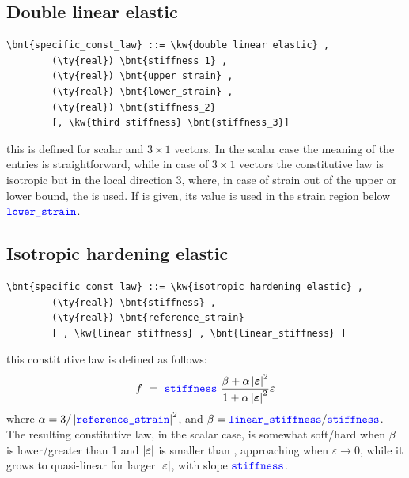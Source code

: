 \subsection{Double linear elastic}
\begin{Verbatim}[commandchars=\\\{\}]
    \bnt{specific_const_law} ::= \kw{double linear elastic} ,
        (\ty{real}) \bnt{stiffness_1} ,
        (\ty{real}) \bnt{upper_strain} ,
        (\ty{real}) \bnt{lower_strain} ,
        (\ty{real}) \bnt{stiffness_2}
        [, \kw{third stiffness} \bnt{stiffness_3}]
\end{Verbatim}
this is defined for scalar and $3 \times 1$ vectors. In the scalar case the
meaning of the entries is straightforward,
while in case of $3 \times 1$ vectors the constitutive law is isotropic
but in the local direction 3, where, in case of strain
out of the upper or lower bound, the  is used.
If  is given, its value is used in the strain region 
below $\textcolor{blue}{\texttt{lower\_strain}}$.
\subsection{Isotropic hardening elastic}
\begin{Verbatim}[commandchars=\\\{\}]
    \bnt{specific_const_law} ::= \kw{isotropic hardening elastic} ,
        (\ty{real}) \bnt{stiffness} ,
        (\ty{real}) \bnt{reference_strain}
        [ , \kw{linear stiffness} , \bnt{linear_stiffness} ]
\end{Verbatim}
this constitutive law is defined as follows:
\begin{displaymath}
    f \ = \ \textcolor{blue}{\texttt{stiffness}} \ \frac{
        \beta + \alpha\left| \boldsymbol{\varepsilon} \right|^2
    }{
        1 + \alpha\left| \boldsymbol{\varepsilon} \right|^2
    }\varepsilon
\end{displaymath}
where $\alpha=3/\left| \textcolor{blue}{\texttt{reference\_strain}} \right|^2$,
and $\beta=\textcolor{blue}{\texttt{linear\_stiffness}}/\textcolor{blue}{\texttt{stiffness}}$.
The resulting constitutive law, in the scalar case,
is somewhat soft/hard when $\beta$ is lower/greater than 1
and $\left| \varepsilon \right|$ is smaller than ,
approaching  when $\varepsilon\rightarrow{0}$,
while it grows to quasi-linear for larger $\left| \varepsilon \right|$, 
with slope $\textcolor{blue}{\texttt{stiffness}}$.

